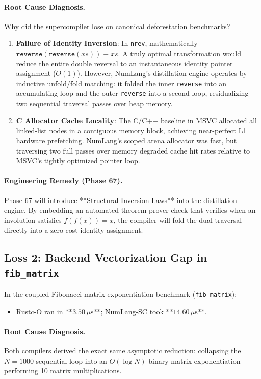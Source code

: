 \paragraph{Root Cause Diagnosis.}
Why did the supercompiler lose on canonical deforestation benchmarks?
\begin{enumerate}
    \item \textbf{Failure of Identity Inversion}: In \texttt{nrev}, mathematically $\mathtt{reverse}(\mathtt{reverse}(xs)) \equiv xs$. A truly optimal transformation would reduce the entire double reversal to an instantaneous identity pointer assignment ($O(1)$). However, NumLang's distillation engine operates by inductive unfold/fold matching: it folded the inner \texttt{reverse} into an accumulating loop and the outer \texttt{reverse} into a second loop, residualizing two sequential traversal passes over heap memory.
    \item \textbf{C Allocator Cache Locality}: The C/C++ baseline in MSVC allocated all linked-list nodes in a contiguous memory block, achieving near-perfect L1 hardware prefetching. NumLang's scoped arena allocator was fast, but traversing two full passes over memory degraded cache hit rates relative to MSVC's tightly optimized pointer loop.
\end{enumerate}

\paragraph{Engineering Remedy (Phase 67).}
Phase 67 will introduce **Structural Inversion Laws** into the distillation engine. By embedding an automated theorem-prover check that verifies when an involution satisfies $f(f(x)) = x$, the compiler will fold the dual traversal directly into a zero-cost identity assignment.

\subsection{Loss 2: Backend Vectorization Gap in \texttt{fib\_matrix}}
In the coupled Fibonacci matrix exponentiation benchmark (\texttt{fib\_matrix}):
\begin{itemize}
    \item Rustc-O ran in **$3.50\,\mu\text{s}$**; NumLang-SC took **$14.60\,\mu\text{s}$**.
\end{itemize}

\paragraph{Root Cause Diagnosis.}
Both compilers derived the exact same asymptotic reduction: collapsing the $N=1000$ sequential loop into an $O(\log N)$ binary matrix exponentiation performing 10 matrix multiplications.

